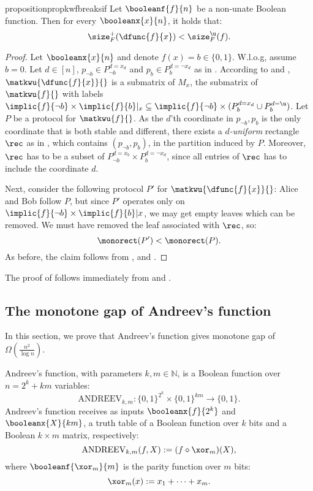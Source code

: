 \documentclass[acmsmall, nonacm, authorversion]{acmart}
\begin{document}
\begin{restatable}
{proposition}{propkwfbreaksif}\label{prop:kw-f-breaks-if}
Let $\booleanf{f}{n}$ be a non-unate Boolean function. Then for every $\booleanx{x}{n}$, it holds that:
\[
    \size_{F}^{+}(\dfunc{f}{x}) < \size_{F}^{\u}(f).
\]
\end{restatable}
\begin{proof}
Let $\booleanx{x}{n}$ and denote $f(x)=b\in\{0,1\}$. 
W.l.o.g, assume $b=0$. Let $d\in [n]$, $p_{\neg b}\in P_{\neg b}^{d=x_d}$ and $p_{b}\in P_{ b}^{d=\neg x_d}$ as in .
According to  and , $\matkwu{\dfunc{f}{x}}{}$ is a submatrix of $M_x$, the submatrix of $\matkwu{f}{}$ with labels $\implic{f}{\neg b}\times \implic{f}{b}|_x \subseteq \implic{f}{\neg b} \times (P_{b}^{d=x_d}\cup P_{b}^{d=\u})$. Let $P$ be a protocol for $\matkwu{f}{}$. As the $d$'th coordinate in $p_{\neg b},p_b$ is the only coordinate that is both stable and different, there exists a \emph{$d$-uniform} rectangle $\rec$ as in , which contains $(p_{\neg b},p_b)$, in the partition induced by $P$. Moreover, $\rec$ has to be a subset of $P_{\neg b}^{d=x_b} \times P_b^{d=\neg x_d}$, since all entries of $\rec$ has to include the coordinate $d$. 

Next, consider the following protocol $P'$ for $\matkwu{\dfunc{f}{x}}{}$: Alice and Bob follow $P$, but since $P'$ operates only on $\implic{f}{\neg b} \times \implic{f}{b}|x$, we may get empty leaves which can be removed. We must have removed the leaf associated with $\rec$, so:
\[
\monorect(P')<\monorect(P).
\]
As before, the claim follows from ,  and  . 
\end{proof}

The proof of  follows immediately from  and .

\subsection{The monotone gap of Andreev's function}\label{subsec:andreev}
In this section, we prove that Andreev's function gives monotone gap of $\Omega\left(\frac{n^2}{\log n}\right)$.

\begin{definition}\label{def:andreev-function}
Andreev's function, with parameters $k, m \in \mathbb{N}$, is a Boolean function over $n=2^k+km$ variables:
\[
\text{ANDREEV}_{k,m} : \{0,1\}^{2^k} \times \{0,1\}^{km} \rightarrow \{0,1\}.
\]
Andreev's function receives as inputs $\booleanx{f}{2^k}$ and $\booleanx{X}{km}$, a truth table of a Boolean function over $k$ bits and a Boolean $k\times m$ matrix, respectively: 
\[
\text{ANDREEV}_{k,m}(f, X) := (f \diamond \xor_m)(X),
\]
where $\booleanf{\xor_m}{m}$ is the parity function over $m$ bits:
\[
\xor_m(x):=x_1+\dots+x_m.
\]
\end{definition}
\end{document}
